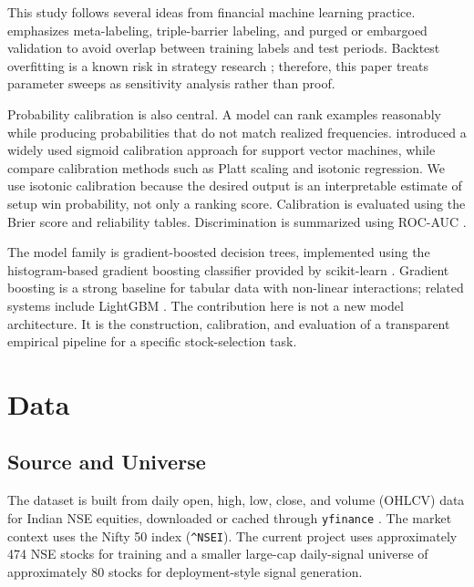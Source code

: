 \documentclass[11pt]{article}
\begin{document}
This study follows several ideas from financial machine learning practice.
\citet{lopezdeprado2018afml} emphasizes meta-labeling, triple-barrier labeling,
and purged or embargoed validation to avoid overlap between training labels and
test periods. Backtest overfitting is a known risk in strategy research
\citep{bailey2014probability,bailey2017deflated}; therefore, this paper treats
parameter sweeps as sensitivity analysis rather than proof.

Probability calibration is also central. A model can rank examples reasonably
while producing probabilities that do not match realized frequencies.
\citet{platt1999probabilistic} introduced a widely used sigmoid calibration
approach for support vector machines, while \citet{niculescu2005predicting}
compare calibration methods such as Platt scaling and isotonic regression. We
use isotonic calibration because the desired output is an interpretable estimate
of setup win probability, not only a ranking score. Calibration is evaluated
using the Brier score \citep{brier1950verification} and reliability tables.
Discrimination is summarized using ROC-AUC \citep{fawcett2006roc}.

The model family is gradient-boosted decision trees, implemented using the
histogram-based gradient boosting classifier provided by scikit-learn
\citep{pedregosa2011scikit}. Gradient boosting is a strong baseline for tabular
data with non-linear interactions; related systems include LightGBM
\citep{ke2017lightgbm}. The contribution here is not a new model architecture.
It is the construction, calibration, and evaluation of a transparent empirical
pipeline for a specific stock-selection task.

\section{Data}

\subsection{Source and Universe}

The dataset is built from daily open, high, low, close, and volume (OHLCV) data
for Indian NSE equities, downloaded or cached through \texttt{yfinance}
\citep{aroussi2024yfinance}. The market context uses the Nifty 50 index
(\texttt{\^{}NSEI}). The current project uses approximately 474 NSE stocks for
training and a smaller large-cap daily-signal universe of approximately 80
stocks for deployment-style signal generation.
\end{document}
